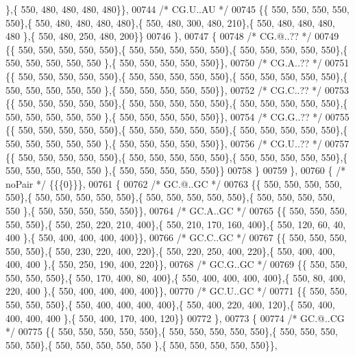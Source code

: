 \begin{DoxyCode}
      \},\{ 550, 480, 480, 480, 480\}\},
00744 \textcolor{comment}{/* CG.U..AU */}
00745 \{\{ 550, 550, 550, 550, 550\},\{ 550, 480, 480, 480, 480\},\{ 550, 480, 300, 480, 210\},\{ 550, 480, 480, 480, 480
      \},\{ 550, 480, 250, 480, 200\}\}
00746 \},
00747 \{
00748 \textcolor{comment}{/* CG.@..?? */}
00749 \{\{ 550, 550, 550, 550, 550\},\{ 550, 550, 550, 550, 550\},\{ 550, 550, 550, 550, 550\},\{ 550, 550, 550, 550, 550
      \},\{ 550, 550, 550, 550, 550\}\},
00750 \textcolor{comment}{/* CG.A..?? */}
00751 \{\{ 550, 550, 550, 550, 550\},\{ 550, 550, 550, 550, 550\},\{ 550, 550, 550, 550, 550\},\{ 550, 550, 550, 550, 550
      \},\{ 550, 550, 550, 550, 550\}\},
00752 \textcolor{comment}{/* CG.C..?? */}
00753 \{\{ 550, 550, 550, 550, 550\},\{ 550, 550, 550, 550, 550\},\{ 550, 550, 550, 550, 550\},\{ 550, 550, 550, 550, 550
      \},\{ 550, 550, 550, 550, 550\}\},
00754 \textcolor{comment}{/* CG.G..?? */}
00755 \{\{ 550, 550, 550, 550, 550\},\{ 550, 550, 550, 550, 550\},\{ 550, 550, 550, 550, 550\},\{ 550, 550, 550, 550, 550
      \},\{ 550, 550, 550, 550, 550\}\},
00756 \textcolor{comment}{/* CG.U..?? */}
00757 \{\{ 550, 550, 550, 550, 550\},\{ 550, 550, 550, 550, 550\},\{ 550, 550, 550, 550, 550\},\{ 550, 550, 550, 550, 550
      \},\{ 550, 550, 550, 550, 550\}\}
00758 \}
00759 \},
00760 \{ \textcolor{comment}{/* noPair */} \{\{\{0\}\}\},
00761 \{
00762 \textcolor{comment}{/* GC.@..GC */}
00763 \{\{ 550, 550, 550, 550, 550\},\{ 550, 550, 550, 550, 550\},\{ 550, 550, 550, 550, 550\},\{ 550, 550, 550, 550, 550
      \},\{ 550, 550, 550, 550, 550\}\},
00764 \textcolor{comment}{/* GC.A..GC */}
00765 \{\{ 550, 550, 550, 550, 550\},\{ 550, 250, 220, 210, 400\},\{ 550, 210, 170, 160, 400\},\{ 550, 120,  60,  40, 400
      \},\{ 550, 400, 400, 400, 400\}\},
00766 \textcolor{comment}{/* GC.C..GC */}
00767 \{\{ 550, 550, 550, 550, 550\},\{ 550, 230, 220, 400, 220\},\{ 550, 220, 250, 400, 220\},\{ 550, 400, 400, 400, 400
      \},\{ 550, 250, 190, 400, 220\}\},
00768 \textcolor{comment}{/* GC.G..GC */}
00769 \{\{ 550, 550, 550, 550, 550\},\{ 550, 170, 400,  80, 400\},\{ 550, 400, 400, 400, 400\},\{ 550,  80, 400, 220, 400
      \},\{ 550, 400, 400, 400, 400\}\},
00770 \textcolor{comment}{/* GC.U..GC */}
00771 \{\{ 550, 550, 550, 550, 550\},\{ 550, 400, 400, 400, 400\},\{ 550, 400, 220, 400, 120\},\{ 550, 400, 400, 400, 400
      \},\{ 550, 400, 170, 400, 120\}\}
00772 \},
00773 \{
00774 \textcolor{comment}{/* GC.@..CG */}
00775 \{\{ 550, 550, 550, 550, 550\},\{ 550, 550, 550, 550, 550\},\{ 550, 550, 550, 550, 550\},\{ 550, 550, 550, 550, 550
      \},\{ 550, 550, 550, 550, 550\}\},

\end{DoxyCode}
